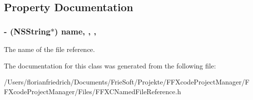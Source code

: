 \subsection{Property Documentation}
\hypertarget{interface_f_f_x_c_named_file_reference_a4b93d352d2fca75b34e1b5a50e03f587}{
\subsubsection[{name}]{\setlength{\rightskip}{0pt plus 5cm}-\/ (N\-S\-String$\ast$) name\hspace{0.3cm}{\ttfamily [read]}, {\ttfamily [write]}, {\ttfamily [nonatomic]}, {\ttfamily [strong]}}}\label{interface_f_f_x_c_named_file_reference_a4b93d352d2fca75b34e1b5a50e03f587}
The name of the file reference. 

The documentation for this class was generated from the following file\-:\begin{DoxyCompactItemize}
\item 
/\-Users/florianfriedrich/\-Documents/\-Frie\-Soft/\-Projekte/\-F\-F\-Xcode\-Project\-Manager/\-F\-F\-Xcode\-Project\-Manager/\-Files/F\-F\-X\-C\-Named\-File\-Reference.\-h\end{DoxyCompactItemize}
